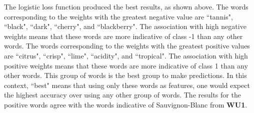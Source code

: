 \documentclass{article}
\begin{document}
\begin{enumerate}
\begin{enumerate}
	\end{enumerate}
	
	The logistic loss function produced the best results, as shown above. The words corresponding to the weights with the greatest negative value are ``tannis", ``black", ``dark", ``cherry", and ``blackberry". The association with high negative weights means that these words are more indicative of class -1 than any other words. The words corresponding to the weights with the greatest positive values are ``citrus", ``crisp", ``lime", ``acidity", and ``tropical". The association with high positive weights means that these words are more indicative of class 1 than any other words. This group of words is the best group to make predictions. In this context, ``best" means that using only these words as features, one would expect the highest accuracy over using any other group of words. The results for the positive words agree with the words indicative of Sauvignon-Blanc from \textbf{WU1}.
	
	\end{enumerate}
\end{document}
